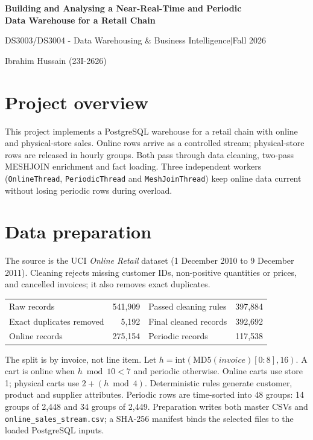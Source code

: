 \documentclass[10pt,a4paper]{article}
\begin{document}
\begin{center}
{\Large\bfseries Building and Analysing a Near-Real-Time and Periodic\\
Data Warehouse for a Retail Chain}\par
\vspace{5pt}
DS3003/DS3004 - Data Warehousing \& Business Intelligence\quad$|$\quad Fall 2026\par
Ibrahim Hussain (23I-2626)
\end{center}

\section{Project overview}
This project implements a PostgreSQL warehouse for a retail chain with online and physical-store sales. Online rows arrive as a controlled stream; physical-store rows are released in hourly groups. Both pass through data cleaning, two-pass MESHJOIN enrichment and fact loading. Three independent workers (\texttt{OnlineThread}, \texttt{PeriodicThread} and \texttt{MeshJoinThread}) keep online data current without losing periodic rows during overload.

\section{Data preparation}
The source is the UCI \emph{Online Retail} dataset (1 December 2010 to 9 December 2011). Cleaning rejects missing customer IDs, non-positive quantities or prices, and cancelled invoices; it also removes exact duplicates.

\begin{center}
\begin{tabular}{lr@{\qquad}lr}
\toprule
Raw records & 541,909 & Passed cleaning rules & 397,884\\
Exact duplicates removed & 5,192 & Final cleaned records & 392,692\\
Online records & 275,154 & Periodic records & 117,538\\
\bottomrule
\end{tabular}
\end{center}

The split is by invoice, not line item. Let $h=\mathrm{int}(\mathrm{MD5}(invoice)[0{:}8],16)$. A cart is online when $h\bmod10<7$ and periodic otherwise. Online carts use store 1; physical carts use $2+(h\bmod4)$. Deterministic rules generate customer, product and supplier attributes. Periodic rows are time-sorted into 48 groups: 14 groups of 2,448 and 34 groups of 2,449. Preparation writes both master CSVs and \texttt{online\_sales\_stream.csv}; a SHA-256 manifest binds the selected files to the loaded PostgreSQL inputs.
\end{document}
